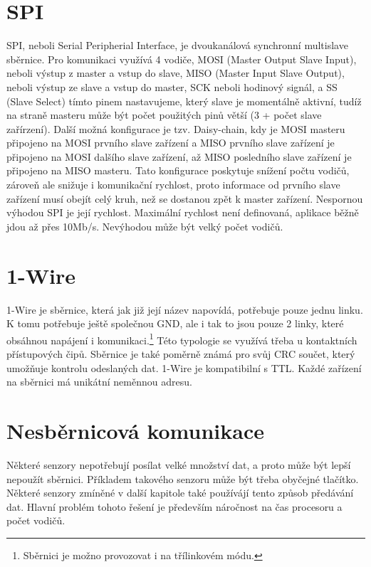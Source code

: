\section{SPI}
SPI, neboli Serial Peripherial Interface, je dvoukanálová synchronní multislave sběrnice.
Pro komunikaci využívá 4 vodiče, MOSI (Master Output Slave Input), neboli výstup z master a vstup do slave, MISO (Master Input Slave Output), neboli výstup ze slave a vstup do master, SCK neboli hodinový signál, a SS (Slave Select) tímto pinem nastavujeme, který slave je momentálně aktivní, tudíž na straně masteru může být počet použitých pinů větší (3 + počet slave zařírzení).
Další možná konfigurace je tzv. Daisy-chain, kdy je  MOSI masteru připojeno na MOSI prvního slave zařízení a MISO prvního slave zařízení je připojeno na MOSI dalšího slave zařízení, až MISO posledního slave zařízení je připojeno na MISO masteru.
Tato konfigurace poskytuje snížení počtu vodičů, zároveň ale snižuje i komunikační rychlost, proto informace od prvního slave zařízení musí obejít celý kruh, než se dostanou zpět k master zařízení.
Nespornou výhodou SPI je její rychlost.
Maximální rychlost není definovaná, aplikace běžně jdou až přes 10Mb/s.
Nevýhodou může být velký počet vodičů.
\cite{nxp:AN2847}

\section{1-Wire}
1-Wire je sběrnice, která jak již její název napovídá, potřebuje pouze jednu linku.
K tomu potřebuje ještě společnou GND, ale i tak to jsou pouze 2 linky, které obsáhnou napájení i komunikaci.\footnote{Sběrnici je možno provozovat i na třílinkovém módu.}
Této typologie se využívá třeba u kontaktních přístupových čipů.
Sběrnice je také poměrně známá pro svůj CRC součet, který umožňuje kontrolu odeslaných dat.
1-Wire je kompatibilní s TTL.
Každé zařízení na sběrnici má unikátní neměnnou adresu.
\cite{one-wire}

\section{Nesběrnicová komunikace}
Některé senzory nepotřebují posílat velké množství dat, a proto může být lepší nepoužít sběrnici. 
Příkladem takového senzoru může být třeba obyčejné tlačítko.
Některé senzory zmíněné v další kapitole také používájí tento způsob předávání dat.
Hlavní problém tohoto řešení je především náročnost na čas procesoru a počet vodičů.

